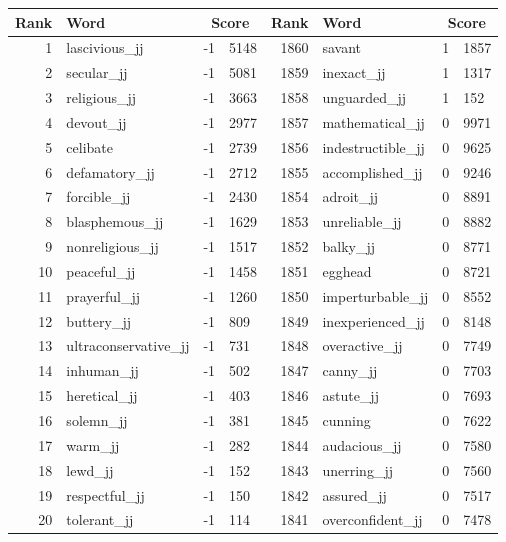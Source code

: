 \begin{table}[tbp]
    \begin{tabular}{| rlr@{.}l | rlr@{.}l |}
    \hline
    \textbf{Rank} & \textbf{Word} & \multicolumn{2}{c|}{\textbf{Score}} & \textbf{Rank} & \textbf{Word} & \multicolumn{2}{c|}{\textbf{Score}} \\
    \hline
    1 & lascivious\_jj & -1 & 5148    &    1860 & savant & 1 & 1857 \\
    2 & secular\_jj & -1 & 5081    &    1859 & inexact\_jj & 1 & 1317 \\
    3 & religious\_jj & -1 & 3663    &    1858 & unguarded\_jj & 1 & 152 \\
    4 & devout\_jj & -1 & 2977    &    1857 & mathematical\_jj & 0 & 9971 \\
    5 & celibate & -1 & 2739    &    1856 & indestructible\_jj & 0 & 9625 \\
    6 & defamatory\_jj & -1 & 2712    &    1855 & accomplished\_jj & 0 & 9246 \\
    7 & forcible\_jj & -1 & 2430    &    1854 & adroit\_jj & 0 & 8891 \\
    8 & blasphemous\_jj & -1 & 1629    &    1853 & unreliable\_jj & 0 & 8882 \\
    9 & nonreligious\_jj & -1 & 1517    &    1852 & balky\_jj & 0 & 8771 \\
    10 & peaceful\_jj & -1 & 1458    &    1851 & egghead & 0 & 8721 \\
    11 & prayerful\_jj & -1 & 1260    &    1850 & imperturbable\_jj & 0 & 8552 \\
    12 & buttery\_jj & -1 & 809    &    1849 & inexperienced\_jj & 0 & 8148 \\
    13 & ultraconservative\_jj & -1 & 731    &    1848 & overactive\_jj & 0 & 7749 \\
    14 & inhuman\_jj & -1 & 502    &    1847 & canny\_jj & 0 & 7703 \\
    15 & heretical\_jj & -1 & 403    &    1846 & astute\_jj & 0 & 7693 \\
    16 & solemn\_jj & -1 & 381    &    1845 & cunning & 0 & 7622 \\
    17 & warm\_jj & -1 & 282    &    1844 & audacious\_jj & 0 & 7580 \\
    18 & lewd\_jj & -1 & 152    &    1843 & unerring\_jj & 0 & 7560 \\
    19 & respectful\_jj & -1 & 150    &    1842 & assured\_jj & 0 & 7517 \\
    20 & tolerant\_jj & -1 & 114    &    1841 & overconfident\_jj & 0 & 7478 \\

\end{tabular}
\end{table}
